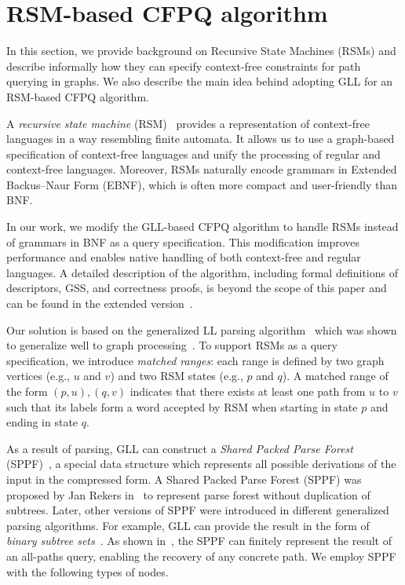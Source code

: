 \documentclass[
11pt,%
tightenlines,%
twoside,%
onecolumn,%
nobibnotes,%
nofootinbib,%
superscriptaddress,%
noshowpacs,%
longbibliography,%
centertags]%
{revtex4-2}
\begin{document}
\section{RSM-based CFPQ algorithm}\label{section:RSM}

In this section, we provide background on Recursive State Machines (RSMs) and describe informally how they can specify context-free constraints for path querying in graphs. 
We also describe the main idea behind adopting GLL for an RSM-based CFPQ algorithm.

A \textit{recursive state machine} (RSM)~\cite{10.1145/1075382.1075387} provides a representation of context-free languages in a way resembling finite automata.
It allows us to use a graph-based specification of context-free languages and unify the processing of regular and context-free languages. 
Moreover, RSMs naturally encode grammars in Extended Backus--Naur Form (EBNF), which is often more compact and user-friendly than BNF.

In our work, we modify the GLL-based CFPQ algorithm to handle RSMs instead of grammars in BNF as a query specification.
This modification improves performance and enables native handling of both context-free and regular languages.
A detailed description of the algorithm, including formal definitions of descriptors, GSS, and correctness proofs, is beyond the scope of this paper and can be found in the extended version~\cite{abzalov2023gllbasedcontextfreepathquerying}.

Our solution is based on the generalized LL parsing algorithm~\cite{SCOTT2010177} which was shown to generalize well to graph processing~\cite{Grigorev:2017:CPQ:3166094.3166104}.
To support RSMs as a query specification, we introduce \emph{matched ranges}: each range is defined by two graph vertices (e.g., $u$ and $v$) and two RSM states (e.g., $p$ and $q$).
A matched range of the form $(p,u),(q,v)$ indicates that there exists at least one path from $u$ to $v$ such that its labels form a word accepted by RSM when starting in state $p$ and ending in state $q$.

As a result of parsing, GLL can construct a \textit{Shared Packed Parse Forest} (SPPF)~\cite{SCOTT20131828}, a special data structure which represents all possible derivations of the input in the compressed form.
A Shared Packed Parse Forest (SPPF) was proposed by Jan Rekers in~\cite{rekers1992parser} to represent parse forest without duplication of subtrees. Later, other versions of SPPF were introduced in different generalized parsing algorithms.
For example, GLL can provide the result in the form of \textit{binary subtree sets}~\cite{SCOTT201963}.
As shown in~\cite{Grigorev:2017:CPQ:3166094.3166104}, the SPPF can finitely represent the result of an all-paths query, enabling the recovery of any concrete path.
We employ SPPF with the following types of nodes. 
\end{document}
